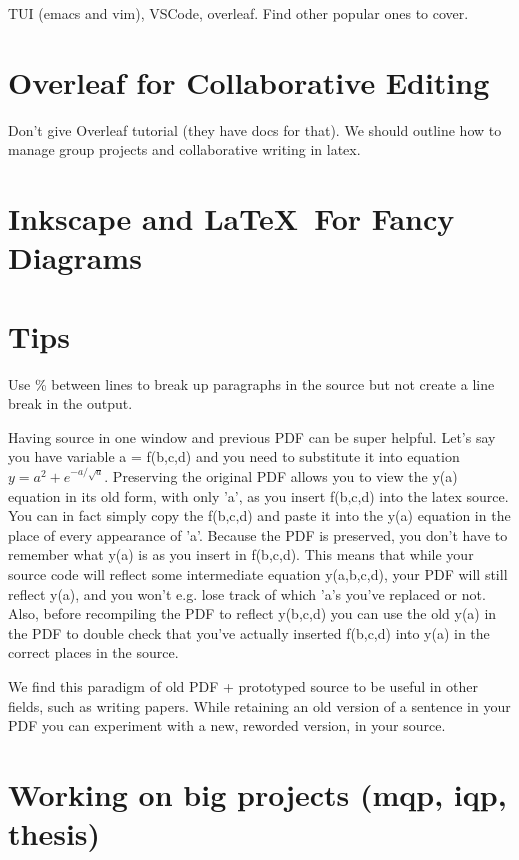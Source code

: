 \documentclass[12pt]{article}
\begin{document}
TUI (emacs and vim), VSCode, overleaf. Find other popular ones to cover.

\section{Overleaf for Collaborative Editing}%
\label{overleaf}

Don't give Overleaf tutorial (they have docs for that). We should outline how to manage group projects and collaborative writing in latex.

\section{Inkscape and \LaTeX\ For Fancy Diagrams}%
\label{inkscape-latex}

\section{Tips}%

Use \% between lines to break up paragraphs in the source but not create a line break in the output.

Having source in one window and previous PDF can be super helpful. Let's say you have variable a = f(b,c,d) and you need to substitute it into equation $y = a^2 + e^{-a/\sqrt{a}}$. Preserving the original PDF allows you to view the y(a) equation in its old form, with only 'a', as you insert f(b,c,d) into the latex source. You can in fact simply copy the f(b,c,d) and paste it into the y(a) equation in the place of every appearance of 'a'. Because the PDF is preserved, you don't have to remember what y(a) is as you insert in f(b,c,d). This means that while your source code will reflect some intermediate equation y(a,b,c,d), your PDF will still reflect y(a), and you won't e.g. lose track of which 'a's you've replaced or not. Also, before recompiling the PDF to reflect y(b,c,d) you can use the old y(a) in the PDF to double check that you've actually inserted f(b,c,d) into y(a) in the correct places in the source.

We find this paradigm of old PDF + prototyped source to be useful in other fields, such as writing papers. While retaining an old version of a sentence in your PDF you can experiment with a new, reworded version, in your source.

\section{Working on big projects (mqp, iqp, thesis)}%
\end{document}
